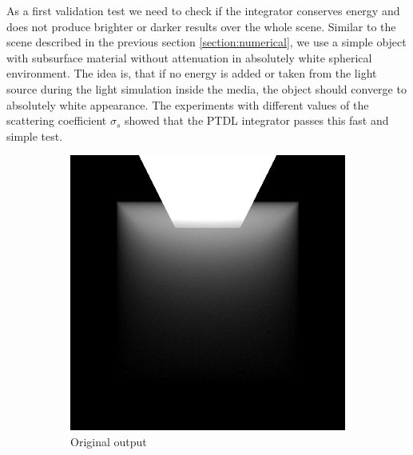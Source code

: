 As a first validation test we need to check if the integrator conserves energy and does not produce
brighter or darker results over the whole scene. Similar to the scene described in the previous
section \ref{section:numerical}, we use a simple object with subsurface material without attenuation
in absolutely white spherical environment. The idea is, that if no energy is added or taken from the
light source during the light simulation inside the media, the object should converge to absolutely
white appearance. The experiments with different values of the scattering coefficient $\sigma_s$
showed that the PTDL integrator passes this fast and simple test.

\begin{figure}
    \centering
    \begin{subfigure}{0.3\textwidth}
        \includegraphics[width=\textwidth]{imgs/renders/cube_area_ptdl}
        \caption{Original output}
    \end{subfigure}
    \quad
    \begin{subfigure}{0.3\textwidth}

\end{subfigure}
\end{figure}

